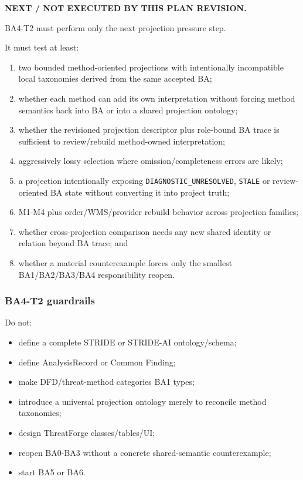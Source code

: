 \documentclass[11pt,a4paper]{article}
\providecommand{\tightlist}{\setlength{\itemsep}{0pt}\setlength{\parskip}{0pt}}
\begin{document}
\textbf{NEXT / NOT EXECUTED BY THIS PLAN REVISION.}

BA4-T2 must perform only the next projection pressure step.

It must test at least:

\begin{enumerate}
\def\labelenumi{\arabic{enumi}.}
\tightlist
\item
  two bounded method-oriented projections with intentionally incompatible local taxonomies derived from the same accepted BA;
\item
  whether each method can add its own interpretation without forcing method semantics back into BA or into a shared projection ontology;
\item
  whether the revisioned projection descriptor plus role-bound BA trace is sufficient to review/rebuild method-owned interpretation;
\item
  aggressively lossy selection where omission/completeness errors are likely;
\item
  a projection intentionally exposing \texttt{DIAGNOSTIC\_UNRESOLVED}, \texttt{STALE} or review-oriented BA state without converting it into project truth;
\item
  M1-M4 plus order/WMS/provider rebuild behavior across projection families;
\item
  whether cross-projection comparison needs any new shared identity or relation beyond BA trace; and
\item
  whether a material counterexample forces only the smallest BA1/BA2/BA3/BA4 responsibility reopen.
\end{enumerate}

\subsubsection{BA4-T2 guardrails}\label{ba4-t2-guardrails}

Do not:

\begin{itemize}
\tightlist
\item
  define a complete STRIDE or STRIDE-AI ontology/schema;
\item
  define AnalysisRecord or Common Finding;
\item
  make DFD/threat-method categories BA1 types;
\item
  introduce a universal projection ontology merely to reconcile method taxonomies;
\item
  design ThreatForge classes/tables/UI;
\item
  reopen BA0-BA3 without a concrete shared-semantic counterexample;
\item
  start BA5 or BA6.
\end{itemize}
\end{document}
